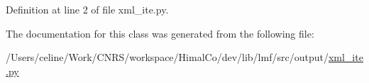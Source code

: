 Definition at line 2 of file xml\+\_\+ite.\+py.



The documentation for this class was generated from the following file\+:\begin{DoxyCompactItemize}
\item 
/\+Users/celine/\+Work/\+C\+N\+R\+S/workspace/\+Himal\+Co/dev/lib/lmf/src/output/\hyperlink{xml__ite_8py}{xml\+\_\+ite.\+py}\end{DoxyCompactItemize}
